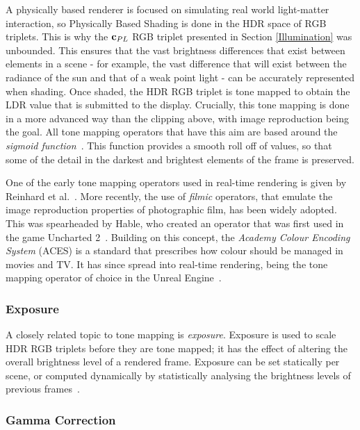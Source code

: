 A physically based renderer is focused on simulating real world light-matter interaction, so Physically Based Shading is done in the HDR space of RGB triplets. This is why the \begin{math}\mathbf{c}_{PL}\end{math} RGB triplet presented in Section \ref{Illumination} was unbounded. This ensures that the vast brightness differences that exist between elements in a scene - for example, the vast difference that will exist between the radiance of the sun and that of a weak point light - can be accurately represented when shading. Once shaded, the HDR RGB triplet is tone mapped to obtain the LDR value that is submitted to the display. Crucially, this tone mapping is done in a more advanced way than the clipping above, with image reproduction being the goal. All tone mapping operators that have this aim are based around the \textit{sigmoid function}~\cite{HoffmanKeynoteEchoChamber}. This function provides a smooth roll off of values, so that some of the detail in the darkest and brightest elements of the frame is preserved.

One of the early tone mapping operators used in real-time rendering is given by Reinhard et al.~\cite{Reinhard}. More recently, the use of \textit{filmic} operators, that emulate the image reproduction properties of photographic film, has been widely adopted. This was spearheaded by Hable, who created an operator that was first used in the game Uncharted 2~\cite{Hable}. Building on this concept, the \textit{Academy Colour Encoding System} (ACES) is a standard that prescribes how colour should be managed in movies and TV. It has since spread into real-time rendering, being the tone mapping operator of choice in the Unreal Engine~\cite{ACESUnreal}.

\subsubsection{Exposure}

A closely related topic to tone mapping is \textit{exposure}. Exposure is used to scale HDR RGB triplets before they are tone mapped; it has the effect of altering the overall brightness level of a rendered frame. Exposure can be set statically per scene, or computed dynamically by statistically analysing the brightness levels of previous frames~\cite{RTR4}.

\subsubsection{Gamma Correction}

